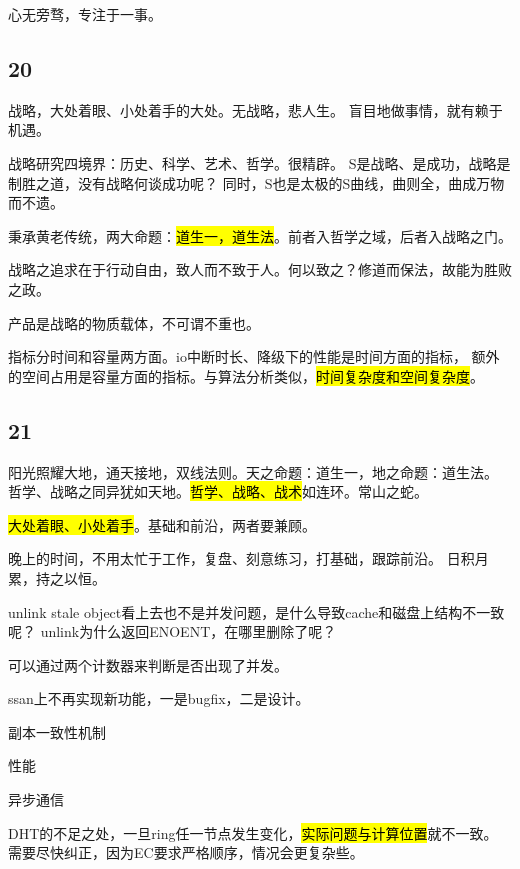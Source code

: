 心无旁骛，专注于一事。

\subsection{20}

战略，大处着眼、小处着手的大处。无战略，悲人生。
盲目地做事情，就有赖于机遇。

战略研究四境界：历史、科学、艺术、哲学。很精辟。
S是战略、是成功，战略是制胜之道，没有战略何谈成功呢？
同时，S也是太极的S曲线，曲则全，曲成万物而不遗。

秉承黄老传统，两大命题：\hl{道生一，道生法}。前者入哲学之域，后者入战略之门。

战略之追求在于行动自由，致人而不致于人。何以致之？修道而保法，故能为胜败之政。

产品是战略的物质载体，不可谓不重也。

\hrulefill

指标分时间和容量两方面。io中断时长、降级下的性能是时间方面的指标，
额外的空间占用是容量方面的指标。与算法分析类似，\hl{时间复杂度和空间复杂度}。

\subsection{21}

阳光照耀大地，通天接地，双线法则。天之命题：道生一，地之命题：道生法。
哲学、战略之同异犹如天地。\hl{哲学、战略、战术}如连环。常山之蛇。

\hl{大处着眼、小处着手}。基础和前沿，两者要兼顾。

晚上的时间，不用太忙于工作，复盘、刻意练习，打基础，跟踪前沿。
日积月累，持之以恒。

\hrulefill

unlink stale object看上去也不是并发问题，是什么导致cache和磁盘上结构不一致呢？
unlink为什么返回ENOENT，在哪里删除了呢？

可以通过两个计数器来判断是否出现了并发。

ssan上不再实现新功能，一是bugfix，二是设计。
\begin{enumbox}
\item 副本一致性机制
\item 性能
\item 异步通信
\end{enumbox}

\hrulefill

DHT的不足之处，一旦ring任一节点发生变化，\hl{实际问题与计算位置}就不一致。
需要尽快纠正，因为EC要求严格顺序，情况会更复杂些。


